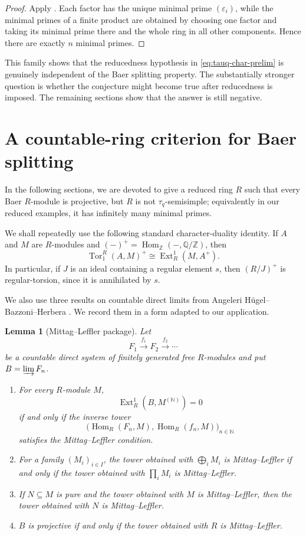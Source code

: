 \documentclass[11pt]{article}
\newtheorem{lemma}[lemma]{Lemma}
\theoremstyle{definition}
\theoremstyle{remark}
\newcommand{\Tor}{\operatorname{Tor}}
\newcommand{\Ext}{\operatorname{Ext}}
\newcommand{\Hom}{\operatorname{Hom}}
\begin{document}
\begin{proof}
Apply .  Each factor has the
unique minimal prime $(\varepsilon_i)$, while the minimal primes of a finite
product are obtained by choosing one factor and taking its minimal prime there
and the whole ring in all other components.  Hence there are exactly $n$
minimal primes.
\end{proof}

This family shows that the reducedness hypothesis in
\eqref{eq:tauq-char-prelim} is genuinely independent of the Baer splitting
property.  The substantially stronger question is whether the conjecture
might become true after reducedness is imposed.  The remaining sections show
that the answer is still negative.

\section{A countable-ring criterion for Baer splitting}\label{sec:criterion}

In the following sections, we are devoted to give a reduced ring $R$	such that every Baer $R$-module is projective, but
$R$ is not $\tau_q$-semisimple; equivalently in our reduced examples, it has infinitely many minimal primes.

We shall repeatedly use the following standard character-duality identity.  If
$A$ and $M$ are $R$-modules and $(-)^+=\Hom_{\mathbb Z}(-,\mathbb Q/\mathbb
Z)$, then
\begin{equation}\label{eq:char-dual}
  \Tor_1^R(A,M)^+\cong \Ext_R^1(M,A^+).
\end{equation}
In particular, if $J$ is an ideal containing a regular element $s$, then
$(R/J)^+$ is regular-torsion, since it is annihilated by $s$.

We also use three results on countable direct limits from
Angeleri H\"ugel--Bazzoni--Herbera \cite[Section~2]{ABH}.  We record them in a
form adapted to our application.

\begin{lemma}[Mittag--Leffler package]\label{lem:MLpackage}
Let
\[
 F_1\xrightarrow{f_1}F_2\xrightarrow{f_2}\cdots
\]
be a countable direct system of finitely generated free $R$-modules and put
$B=\varinjlim F_n$.
\begin{enumerate}[label=\textup{(\arabic*)}]
\item For every $R$-module $M$,
\[
 \Ext_R^1(B,M^{(\mathbb N)})=0
\]
if and only if the inverse tower
\[
 \bigl(\Hom_R(F_n,M),\Hom_R(f_n,M)\bigr)_{n\in\mathbb N}
\]
satisfies the Mittag--Leffler condition.
\item For a family $(M_i)_{i\in I}$, the tower obtained with
$\bigoplus_iM_i$ is Mittag--Leffler if and only if the tower obtained with
$\prod_iM_i$ is Mittag--Leffler.
\item If $N\subseteq M$ is pure and the tower obtained with $M$ is
Mittag--Leffler, then the tower obtained with $N$ is Mittag--Leffler.
\item $B$ is projective if and only if the tower obtained with $R$ is
Mittag--Leffler.
\end{enumerate}
\end{lemma}
\end{document}
